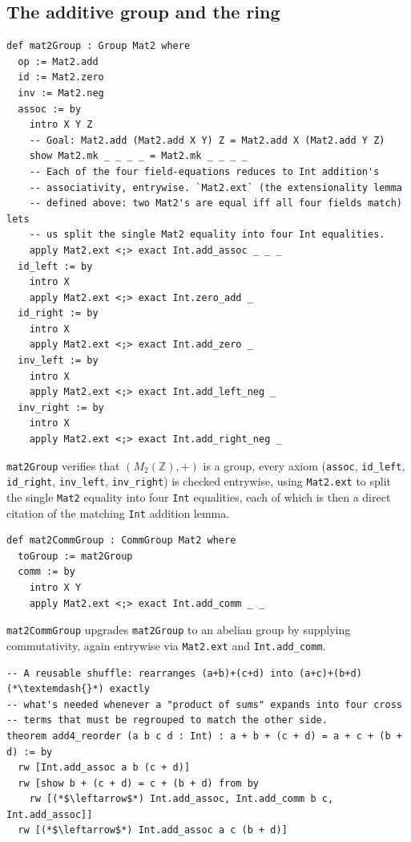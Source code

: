 \subsection{The additive group and the ring}\label{sec:09-rings:07-matrices:4}

\begin{lstlisting}
def mat2Group : Group Mat2 where
  op := Mat2.add
  id := Mat2.zero
  inv := Mat2.neg
  assoc := by
    intro X Y Z
    -- Goal: Mat2.add (Mat2.add X Y) Z = Mat2.add X (Mat2.add Y Z)
    show Mat2.mk _ _ _ _ = Mat2.mk _ _ _ _
    -- Each of the four field-equations reduces to Int addition's
    -- associativity, entrywise. `Mat2.ext` (the extensionality lemma
    -- defined above: two Mat2's are equal iff all four fields match) lets
    -- us split the single Mat2 equality into four Int equalities.
    apply Mat2.ext <;> exact Int.add_assoc _ _ _
  id_left := by
    intro X
    apply Mat2.ext <;> exact Int.zero_add _
  id_right := by
    intro X
    apply Mat2.ext <;> exact Int.add_zero _
  inv_left := by
    intro X
    apply Mat2.ext <;> exact Int.add_left_neg _
  inv_right := by
    intro X
    apply Mat2.ext <;> exact Int.add_right_neg _
\end{lstlisting}

\texttt{mat2Group} verifies that \((M_2(\mathbb{Z}), +)\) is a group, every axiom (\texttt{assoc}, \texttt{id\_\allowbreak{}left}, \texttt{id\_\allowbreak{}right}, \texttt{inv\_\allowbreak{}left}, \texttt{inv\_\allowbreak{}right}) is checked entrywise, using \texttt{Mat2.ext} to split the single \texttt{Mat2} equality into four \texttt{Int} equalities, each of which is then a direct citation of the matching \texttt{Int} addition lemma.

\begin{lstlisting}
def mat2CommGroup : CommGroup Mat2 where
  toGroup := mat2Group
  comm := by
    intro X Y
    apply Mat2.ext <;> exact Int.add_comm _ _
\end{lstlisting}

\texttt{mat2CommGroup} upgrades \texttt{mat2Group} to an abelian group by supplying commutativity, again entrywise via \texttt{Mat2.ext} and \texttt{Int.add\_\allowbreak{}comm}.

\begin{lstlisting}
-- A reusable shuffle: rearranges (a+b)+(c+d) into (a+c)+(b+d) (*\textemdash{}*) exactly
-- what's needed whenever a "product of sums" expands into four cross
-- terms that must be regrouped to match the other side.
theorem add4_reorder (a b c d : Int) : a + b + (c + d) = a + c + (b + d) := by
  rw [Int.add_assoc a b (c + d)]
  rw [show b + (c + d) = c + (b + d) from by
    rw [(*$\leftarrow$*) Int.add_assoc, Int.add_comm b c, Int.add_assoc]]
  rw [(*$\leftarrow$*) Int.add_assoc a c (b + d)]
\end{lstlisting}

